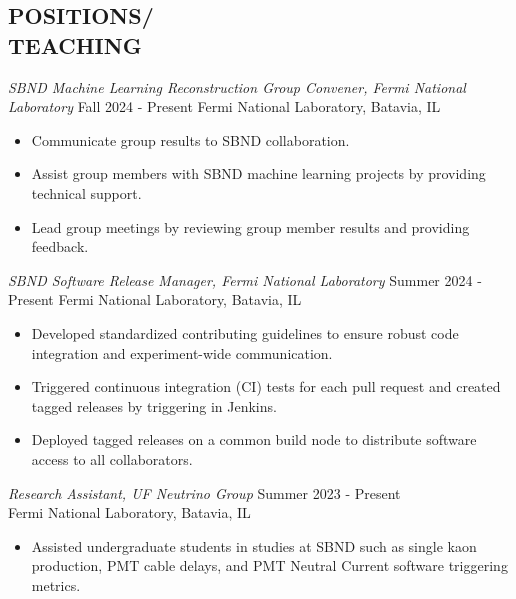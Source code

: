\documentclass[margin, 10pt]{res} %
\begin{document}
\begin{resume}
\section{POSITIONS/\\TEACHING}
{\sl SBND Machine Learning Reconstruction Group Convener, Fermi National Laboratory}
\hfill Fall 2024 - Present
Fermi National Laboratory, Batavia, IL
\begin{itemize}
    \item Communicate group results to SBND collaboration.
    \item Assist group members with SBND machine learning projects by providing technical support.
    \item Lead group meetings by reviewing group member results and providing feedback.
\end{itemize}

{\sl SBND Software Release Manager, Fermi National Laboratory}
\hfill Summer 2024 - Present
Fermi National Laboratory, Batavia, IL
\begin{itemize}
    \item Developed standardized contributing guidelines to ensure robust code integration and experiment-wide communication.
    \item Triggered continuous integration (CI) tests for each pull request and created tagged releases by triggering in Jenkins.
    \item Deployed tagged releases on a common build node to distribute software access to all collaborators.
\end{itemize}

{\sl Research Assistant, UF Neutrino Group}
\hfill Summer 2023 - Present \\
Fermi National Laboratory, Batavia, IL
\begin{itemize}
    \item Assisted undergraduate students in studies at SBND such as single kaon production, PMT cable delays, and PMT Neutral Current software triggering metrics.
\end{itemize}



\end{resume}
\end{document}
